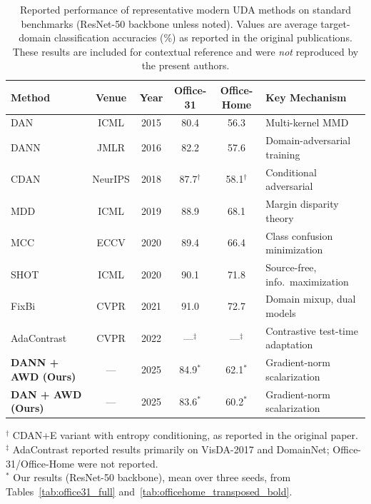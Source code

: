 \documentclass[pdflatex,sn-mathphys-num]{sn-jnl}
\theoremstyle{thmstyleone}
\theoremstyle{thmstyletwo}
\theoremstyle{thmstylethree}
\begin{document}
\begin{table}
\centering
\scriptsize
\caption{Reported performance of representative modern UDA methods on standard benchmarks (ResNet-50 backbone unless noted). Values are average target-domain classification accuracies (\%) as reported in the original publications. These results are included for contextual reference and were \emph{not} reproduced by the present authors.}
\label{tab:modern_uda_context}

\begin{tabular}{l c c c c p{4.2cm}}
\toprule
\textbf{Method} & \textbf{Venue} & \textbf{Year} & \textbf{Office-31} & \textbf{Office-Home} & \textbf{Key Mechanism} \\
\midrule
DAN~\cite{long2015dan}  & ICML   & 2015 & 80.4 & 56.3 & Multi-kernel MMD \\
DANN~\cite{ganin2016dann} & JMLR & 2016 & 82.2 & 57.6 & Domain-adversarial training \\
\midrule
CDAN~\cite{long2018cdan} & NeurIPS & 2018 & 87.7$^{\dagger}$ & 58.1$^{\dagger}$ & Conditional adversarial \\
MDD~\cite{zhang2019mdd}   & ICML   & 2019 & 88.9 & 68.1 & Margin disparity theory \\
MCC~\cite{jin2020mcc}     & ECCV   & 2020 & 89.4 & 66.4 & Class confusion minimization \\
SHOT~\cite{liang2020shot} & ICML   & 2020 & 90.1 & 71.8 & Source-free, info.\ maximization \\
FixBi~\cite{na2021fixbi}  & CVPR   & 2021 & 91.0 & 72.7 & Domain mixup, dual models \\
AdaContrast~\cite{chen2022contrastive} & CVPR & 2022 & ---$^{\ddagger}$ & ---$^{\ddagger}$ & Contrastive test-time adaptation \\
\midrule
\textbf{DANN + AWD (Ours)} & --- & 2025 & 84.9$^{*}$ & 62.1$^{*}$ & Gradient-norm scalarization \\
\textbf{DAN + AWD (Ours)}  & --- & 2025 & 83.6$^{*}$ & 60.2$^{*}$ & Gradient-norm scalarization \\
\bottomrule
\end{tabular}

\vspace{2pt}
\footnotesize
$^{\dagger}$ CDAN+E variant with entropy conditioning, as reported in the original paper. \\
$^{\ddagger}$ AdaContrast reported results primarily on VisDA-2017 and DomainNet; Office-31/Office-Home were not reported. \\
$^{*}$ Our results (ResNet-50 backbone), mean over three seeds, from Tables~\ref{tab:office31_full} and~\ref{tab:officehome_transposed_bold}. \\
\end{table}
\clearpage
\end{document}
